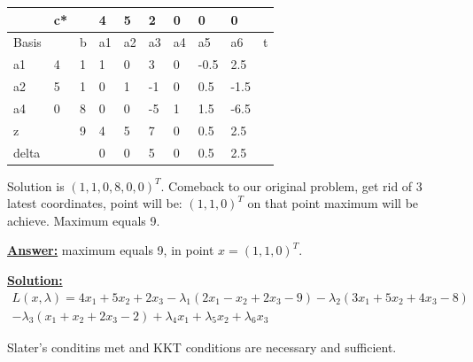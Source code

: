 \begin{table}[H]
\begin{tabular}{|l|l|l|l|l|l|l|l|l|l|}
\hline
      & c* &   & 4  & 5  & 2  & 0  & 0    & 0    &   \\ \hline
Basis &    & b & a1 & a2 & a3 & a4 & a5   & a6   & t \\ \hline
a1    & 4  & 1 & 1  & 0  & 3  & 0  & -0.5 & 2.5  &   \\ \hline
a2    & 5  & 1 & 0  & 1  & -1 & 0  & 0.5  & -1.5 &   \\ \hline
a4    & 0  & 8 & 0  & 0  & -5 & 1  & 1.5  & -6.5 &   \\ \hline
z     &    & 9 & 4  & 5  & 7  & 0  & 0.5  & 2.5  &   \\ \hline
delta &    &   & 0  & 0  & 5  & 0  & 0.5  & 2.5  &   \\ \hline
\end{tabular}
\end{table}

Solution is $(1, 1, 0, 8, 0, 0)^T$. Comeback to our original problem, get rid of 3 latest coordinates, point will be: $(1, 1, 0)^T$ on that point maximum will be achieve. Maximum equals 9.

\underline{\textbf{Answer:}} maximum equals 9, in point $x = (1, 1, 0)^T$.

\underline{\textbf{Solution:}}
\begin{equation*}
\begin{gathered}
    L(x, \lambda) = 4x_1 + 5x_2 + 2x_3 - \lambda_1(2x_1 - x_2 + 2x_3 -9) - \lambda_2(3x_1 + 5x_2 + 4x_3 -8) \\
    - \lambda_3(x_1 + x_2 + 2x_3 -2) + \lambda_4 x_1 + \lambda_5 x_2 + \lambda_6 x_3
\end{gathered}
\end{equation*}

Slater's conditins met and KKT conditions are necessary and sufficient.

